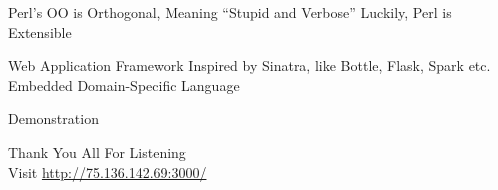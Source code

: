 \nextframe
\begin{frame}
    \begin{itemize}
        \fitem Perl's OO is Orthogonal\pause, Meaning ``Stupid and Verbose''
        \fitem Luckily, Perl is Extensible
    \end{itemize}
\end{frame}

\nextframe
\begin{frame}
    \begin{itemize}
        \fitem Web Application Framework
        \fitem Inspired by Sinatra, like Bottle, Flask, Spark etc.
        \fitem Embedded Domain-Specific Language
    \end{itemize}
\end{frame}

\nextframe
\begin{frame}
    \begin{center}\vspace{75pt}
        {\Huge Demonstration}
    \end{center}
\end{frame}

\nextframe
\begin{frame}
    \begin{center}\vspace{70pt}
        {\Huge Thank You All For Listening}\\
        \vspace{54.35pt}
        Visit \url{http://75.136.142.69:3000/}
    \end{center}
\end{frame}


